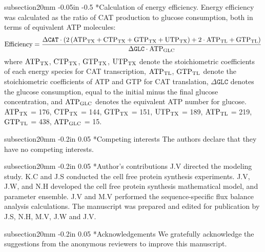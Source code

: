\documentclass[12pt]{article}
\makeatletter
\renewcommand\subsection{\@startsection
	{subsection}{2}{0mm}
	{-0.05in}
	{-0.5\baselineskip}
	{\normalfont\normalsize\bfseries}}
\renewcommand\section{\@startsection
	{subsection}{2}{0mm}
	{-0.2in}
	{0.05\baselineskip}
	{\normalfont\large\bfseries}}
\makeatother
\begin{document}
\subsection*{Calculation of energy efficiency.}
Energy efficiency was calculated as the ratio of CAT production to glucose consumption, both in terms of equivalent ATP molecules:
\begin{equation}\label{eqn:energy-efficiency-definition}
	\rm Efficiency=\frac{\Delta\texttt{CAT}\cdot \left(2\left({ATP}_{TX}+\rm {CTP}_{TX}+\rm {GTP}_{TX}+\rm {UTP}_{TX}\right)+\rm2\cdot\rm {ATP}_{TL}+\rm {GTP}_{TL}\right)}{\Delta\texttt{GLC}\cdot \rm {ATP}_{GLC}}
\end{equation}
where $\rm {ATP}_{TX}$, $\rm {CTP}_{TX}$, $\rm {GTP}_{TX}$, $\rm {UTP}_{TX}$ denote the stoichiometric coefficients of each energy species for CAT transcription, $\rm {ATP}_{TL}$, $\rm {GTP}_{TL}$ denote the stoichiometric coefficients of ATP and GTP for CAT translation, $\Delta\texttt{GLC}$ denotes the glucose consumption, equal to the initial minus the final glucose concentration, and $\rm {ATP}_{GLC}$ denotes the equivalent ATP number for glucose.
$\rm {ATP}_{TX}$ = 176, $\rm {CTP}_{TX}$ = 144, $\rm {GTP}_{TX}$ = 151, $\rm {UTP}_{TX}$ = 189, $\rm {ATP}_{TL}$ = 219, $\rm {GTP}_{TL}$ = 438, $\rm {ATP}_{GLC}$ = 15.

\clearpage

\section*{Competing interests}
The authors declare that they have no competing interests.

\section*{Author's contributions}
J.V directed the modeling study.
K.C and J.S conducted the cell free protein synthesis experiments.
J.V, J.W, and N.H developed the cell free protein synthesis mathematical model, and parameter ensemble.
J.V and M.V performed the sequence-specific flux balance analysis calculations.
The manuscript was prepared and edited for publication by J.S, N.H, M.V, J.W and J.V.

\section*{Acknowledgements}
We gratefully acknowledge the suggestions from the anonymous reviewers to improve this manuscript.
\end{document}
